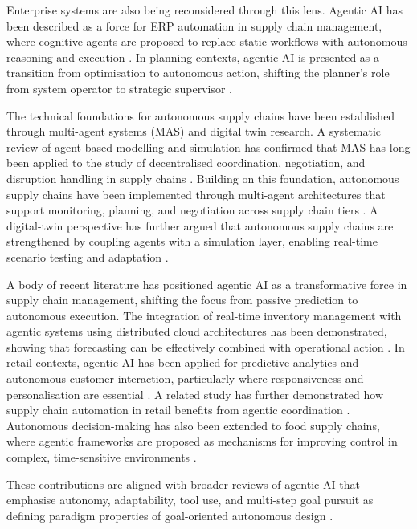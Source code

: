 Enterprise systems are also being reconsidered through this lens. Agentic AI has been described as a force for ERP automation in supply chain management, where cognitive agents are proposed to replace static workflows with autonomous reasoning and execution \cite{Joshi2025}. In planning contexts, agentic AI is presented as a transition from optimisation to autonomous action, shifting the planner's role from system operator to strategic supervisor \cite{Ganesan2025}.

The technical foundations for autonomous supply chains have been established through multi-agent systems (\gls{MAS}) and digital twin research. A systematic review of agent-based modelling and simulation has confirmed that \gls{MAS} has long been applied to the study of decentralised coordination, negotiation, and disruption handling in supply chains \cite{WangZhangLiu2020}. Building on this foundation, autonomous supply chains have been implemented through multi-agent architectures that support monitoring, planning, and negotiation across supply chain tiers \cite{XuEtAl2024}. A digital-twin perspective has further argued that autonomous supply chains are strengthened by coupling agents with a simulation layer, enabling real-time scenario testing and adaptation \cite{XuLuEtAl2024}.

A body of recent literature has positioned agentic AI as a transformative force in supply chain management, shifting the focus from passive prediction to autonomous execution. The integration of real-time inventory management with agentic systems using distributed cloud architectures has been demonstrated, showing that forecasting can be effectively combined with operational action \cite{Tiwari2025}. In retail contexts, agentic AI has been applied for predictive analytics and autonomous customer interaction, particularly where responsiveness and personalisation are essential \cite{Kalisetty2024}. A related study has further demonstrated how supply chain automation in retail benefits from agentic coordination \cite{KalisettySingireddy2023}. Autonomous decision-making has also been extended to food supply chains, where agentic frameworks are proposed as mechanisms for improving control in complex, time-sensitive environments \cite{Pamisetty2024}.

These contributions are aligned with broader reviews of agentic AI that emphasise autonomy, adaptability, tool use, and multi-step goal pursuit as defining paradigm properties of goal-oriented autonomous design \cite{HosseiniSeilani2025}.

